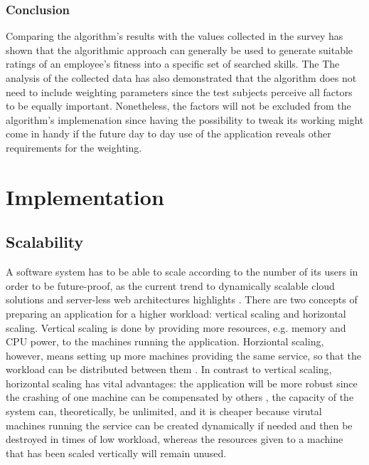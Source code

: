 \subsubsection{Conclusion}
Comparing the algorithm's results with the values collected in the survey has shown that the algorithmic approach can generally be used to generate
suitable ratings of an employee's fitness into a specific set of searched skills.
The
The analysis of the collected data has also demonstrated that the algorithm
does not need to include weighting parameters since the test subjects perceive all factors to be equally important. Nonetheless, the factors will not be excluded from the algorithm's implemenation since having the possibility to tweak its working might come in handy if the future day to day use of the application reveals other requirements for the weighting.

\newpage


\section{Implementation}
\subsection{Scalability}
\label{scale}
A software system has to be able to scale according to the number of its users in order to be future-proof, as the current trend to dynamically scalable cloud solutions and server-less web architectures highlights \cite{allthecloud}. There are two concepts of preparing an application for a higher workload: vertical scaling and horizontal scaling. Vertical scaling is done by providing more resources, e.g. memory and CPU power, to the machines running the application. Horziontal scaling, however, means setting up more machines providing the same service, so that the workload can be distributed between them \cite{hvscale}. In contrast to vertical scaling, horizontal scaling has vital advantages: the application will be more robust since the crashing of one machine can be compensated by others \cite{fedi}, the capacity of the system can, theoretically, be unlimited, and it is cheaper because virutal machines running the service can be created dynamically if needed and then be destroyed in times of low workload, whereas the resources given to a machine that has been scaled vertically will remain unused.

